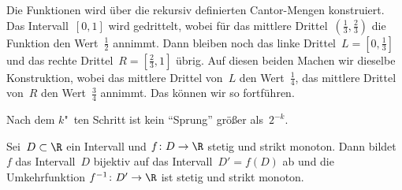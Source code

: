 \documentclass[a4paper]{article}
\begin{document}
\begin{example}
\begin{enumerate}
              Die Funktionen wird über die rekursiv definierten Cantor-Mengen konstruiert. Das Intervall~$[0, 1]$ wird gedrittelt, wobei für das mittlere Drittel~$(\frac{1}{3},\frac{2}{3})$ die Funktion den Wert~$\frac{1}{2}$ annimmt. Dann bleiben noch das linke Drittel~$L = [0,\frac{1}{3}]$ und das rechte Drittel~$R = [\frac{2}{3},1]$ übrig. Auf diesen beiden Machen wir dieselbe Konstruktion, wobei das mittlere Drittel von~$L$ den Wert~$\frac{1}{4}$, das mittlere Drittel von~$R$ den Wert~$\frac{3}{4}$ annimmt. Das können wir so fortführen.
              \begin{center}
              \end{center}
              Nach dem $k$"~ten Schritt ist kein "`Sprung"' größer als~$2^{-k}$.
    \end{enumerate}
\end{example}

\begin{theorem}\label{thm:continuity:inverse}
    Sei~$D \subset \R$ ein Intervall und $f\colon D \to \R$ stetig und strikt monoton. Dann bildet~$f$ das Intervall~$D$ bijektiv auf das Intervall~$D' = f(D)$ ab und die Umkehrfunktion $f^{-1}\colon D' \to \R$ ist stetig und strikt monoton.
\end{theorem}
\end{document}
